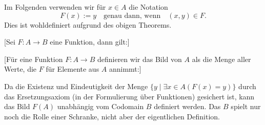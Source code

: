 \documentclass[main.tex]{subfiles}
\begin{document}
\begin{remark}
Im Folgenden verwenden wir für \(x \in A\) die Notation
\[
F(x) := y \quad\text{genau dann, wenn}\quad (x,y)\in F.
\]
Dies ist wohldefiniert aufgrund des obigen Theorems.
\end{remark}

[Sei \(F\colon A\to B\) eine Funktion, dann gilt:]

\begin{tabproof}
\end{tabproof}

%
[Für eine Funktion \(F:A\to B\) definieren wir das Bild von \(A\) als die Menge aller Werte, 
die \(F\) für Elemente aus \(A\) annimmt:]

\begin{remark}
Da die Existenz und Eindeutigkeit der Menge 
\(\{y \mid \exists x \in A(F(x)=y)\}\) durch das 
Ersetzungsaxiom (in der Formulierung über Funktionen) gesichert ist, 
kann das Bild \(F(A)\) unabhängig vom Codomain \(B\) definiert werden. 
Das \(B\) spielt nur noch die Rolle einer Schranke, nicht aber der eigentlichen Definition.
\end{remark}
\end{document}
